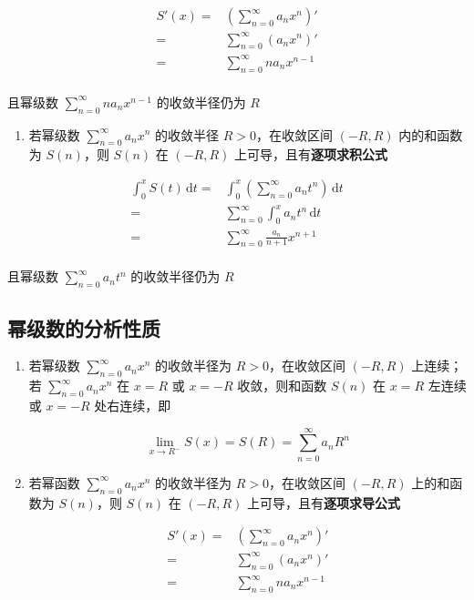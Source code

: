 \documentclass[lang = zh , final , oneside , openany , titlepage , zihao = -4 , linespread = 1.3 , baselineskip = false , cjk-font = windows , text-font = newtx , math-font = newtx]{sjtureport}
\begin{document}
\begin{definition}
\[\begin{aligned}
  S'(x) = &\left(\sum_{n=0}^\infty a_nx^n\right)'\\
    = &\sum_{n=0}^\infty \left(a_nx^n\right)'\\
    = &\sum_{n=0}^\infty na_nx^{n-1}\\
  \end{aligned}\]

且幂级数 \(\displaystyle \sum_{n=0}^\infty na_nx^{n-1}\) 的收敛半径仍为
\(R\)

\begin{enumerate}
\item
  若幂级数 \(\displaystyle \sum_{n=0}^\infty a_nx^n\) 的收敛半径
  \(R>0\)，在收敛区间 \((-R,R)\) 内的和函数为 \(S(n)\)，则 \(S(n)\) 在
  \((-R,R)\) 上可导，且有\textbf{逐项求积公式}
\end{enumerate}

\[\begin{aligned}
  \int_0^xS(t)\,\mathrm{d}t = &\int_0^x\left(\sum_{n=0}^\infty a_nt^n\right)\,\mathrm{d}t\\
    = &\sum_{n=0}^\infty \int_0^x a_nt^n\,\mathrm{d}t\\
    = &\sum_{n=0}^\infty \frac{a_n}{n+1}x^{n+1}\\
  \end{aligned}\]

且幂级数 \(\displaystyle \sum_{n=0}^\infty a_nt^n\) 的收敛半径仍为 \(R\)

\subsection{幂级数的分析性质}

\begin{enumerate}
    \item 若幂级数 \(\displaystyle \sum_{n=0}^\infty a_nx^n\) 的收敛半径为
\(R>0\)，在收敛区间 \((-R,R)\) 上连续；若
\(\displaystyle\sum_{n=0}^\infty a_nx^n\) 在 \(x=R\) 或 \(x=-R\)
收敛，则和函数 \(S(n)\) 在 \(x=R\) 左连续或 \(x=-R\) 处右连续，即

\[\displaystyle \lim_{x\to R^-}S(x)=S(R)=\sum_{n=0}^\infty a_nR^n\]

    \item 若幂函数 \(\displaystyle \sum_{n=0}^\infty a_nx^n\) 的收敛半径为
\(R>0\)，在收敛区间 \((-R,R)\) 上的和函数为 \(S(n)\)，则 \(S(n)\) 在
\((-R,R)\) 上可导，且有\textbf{逐项求导公式}

\[\begin{aligned}
S'(x) = &\left(\sum_{n=0}^\infty a_nx^n\right)'\\
  = &\sum_{n=0}^\infty \left(a_nx^n\right)'\\
  = &\sum_{n=0}^\infty na_nx^{n-1}\\
\end{aligned}\]


\end{enumerate}
\end{definition}
\end{document}
